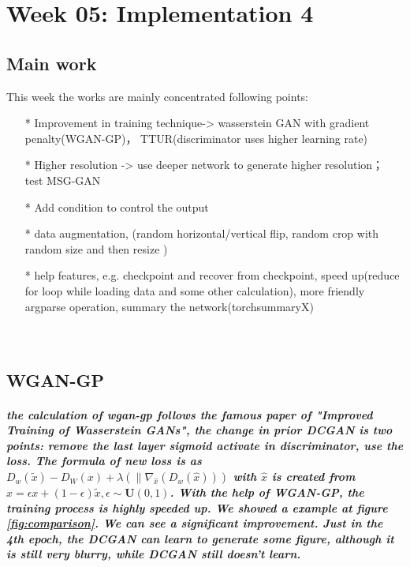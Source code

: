 \newpage
\chapter{Week 05: Implementation 4}
\section{Main work }

This week the works are mainly concentrated following points:


\begin{enumerate}
\item[*] Improvement in training technique-> wasserstein GAN with gradient penalty(WGAN-GP)， TTUR(discriminator uses higher learning rate)
\item[*] Higher resolution -> use deeper network to generate higher resolution； test MSG-GAN
\item[*] Add condition to control the output 
\item[*] data augmentation, (random horizontal/vertical flip, random crop with random size and then resize )
\item[*] help features, e.g. checkpoint and recover from checkpoint, speed up(reduce for loop while loading data and some other calculation), more friendly argparse operation, summary the network(torchsummaryX)
\end{enumerate}
\paragraph{
	\\
 }


\section{WGAN-GP}
\paragraph{
the calculation of wgan-gp follows the famous paper of "Improved Training of Wasserstein GANs", the change in prior DCGAN is two points: remove the last layer sigmoid activate in discriminator, use the loss. The formula of new loss is as $D_w(\widetilde{x}) - D_W(x) + \lambda(\| \nabla_{\hat{x}} (D_w(\hat{x})))$ with $\hat{x}$ is created from $\hat{x}=\epsilon x + (1-\epsilon) \widetilde{x}, \epsilon \sim \mathbf{U} (0, 1) $. With the help of WGAN-GP, the training process is highly speeded up. We showed a example at figure \ref{fig:comparison}. We can see a significant improvement. Just in the 4th epoch, the DCGAN can learn to generate some figure, although it is still very blurry, while DCGAN still doesn't learn.
}

